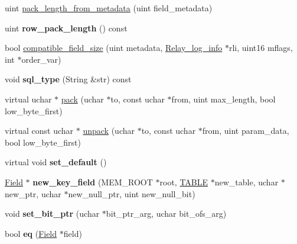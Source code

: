 \begin{DoxyCompactItemize}
\item 
uint \mbox{\hyperlink{classField__bit_abb93169009e3b74b3b94a2ae33c9b802}{pack\+\_\+length\+\_\+from\+\_\+metadata}} (uint field\+\_\+metadata)
\item 
\mbox{\label{classField__bit_aba344333fc0e8cd1aefa93435f7a8b84}} 
uint {\bfseries row\+\_\+pack\+\_\+length} () const
\item 
bool \mbox{\hyperlink{classField__bit_abc1d459f116ca15efd4d0e84c5fc65fd}{compatible\+\_\+field\+\_\+size}} (uint metadata, \mbox{\hyperlink{classRelay__log__info}{Relay\+\_\+log\+\_\+info}} $\ast$rli, uint16 mflags, int $\ast$order\+\_\+var)
\item 
\mbox{\label{classField__bit_af27f7d6a9c1471fb03c8aca653d7832d}} 
void {\bfseries sql\+\_\+type} (String \&str) const
\item 
virtual uchar $\ast$ \mbox{\hyperlink{classField__bit_a330cb15674837be6c0487ffcbbdc9ba4}{pack}} (uchar $\ast$to, const uchar $\ast$from, uint max\+\_\+length, bool low\+\_\+byte\+\_\+first)
\item 
virtual const uchar $\ast$ \mbox{\hyperlink{classField__bit_ae770942d4124955fc0e4cfae31ea932d}{unpack}} (uchar $\ast$to, const uchar $\ast$from, uint param\+\_\+data, bool low\+\_\+byte\+\_\+first)
\item 
\mbox{\label{classField__bit_a32d868f1372e5295e8c7385fa71d01ba}} 
virtual void {\bfseries set\+\_\+default} ()
\item 
\mbox{\label{classField__bit_a1c46c3841e12746be1d6c4729520d062}} 
\mbox{\hyperlink{classField}{Field}} $\ast$ {\bfseries new\+\_\+key\+\_\+field} (M\+E\+M\+\_\+\+R\+O\+OT $\ast$root, \mbox{\hyperlink{structTABLE}{T\+A\+B\+LE}} $\ast$new\+\_\+table, uchar $\ast$new\+\_\+ptr, uchar $\ast$new\+\_\+null\+\_\+ptr, uint new\+\_\+null\+\_\+bit)
\item 
\mbox{\label{classField__bit_aadf45001e4c4fad99b02712e30be0c74}} 
void {\bfseries set\+\_\+bit\+\_\+ptr} (uchar $\ast$bit\+\_\+ptr\+\_\+arg, uchar bit\+\_\+ofs\+\_\+arg)
\item 
\mbox{\label{classField__bit_a48997d798dbcfc4dcd0e2e46405a4585}} 
bool {\bfseries eq} (\mbox{\hyperlink{classField}{Field}} $\ast$field)

\end{DoxyCompactItemize}
